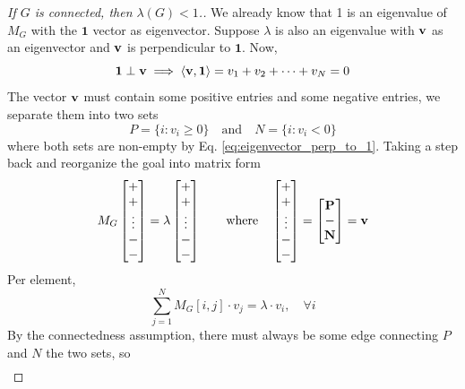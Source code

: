 \begin{proof} [If $G$ is connected, then $\lambda(G) < 1$.] We already know that 1 is an eigenvalue of $M_G$ with the $\mathbf 1$ vector as eigenvector. Suppose $\lambda$ is also an eigenvalue with $\mathbf{v}$ as an eigenvector and $\mathbf{v}$ is perpendicular to $\mathbf 1$. Now, 
\begin{equation}
	\label{eq:eigenvector_perp_to_1}
	\mathbf 1 \perp \mathbf{v} \implies \langle \mathbf{v}, \mathbf 1 \rangle = v_1 + v_2 + \dots  + v_N  = 0
\end{equation}
The vector $\mathbf{v}$ must contain some positive entries and some negative entries, we separate them into two sets
\begin{equation}
	P = \{ i : v_i \geq 0\} \quad \text{and} \quad N = \{ i : v_i < 0 \}
\end{equation}
where both sets are non-empty by Eq. \ref{eq:eigenvector_perp_to_1}. Taking a step back and reorganize the goal into matrix form
\begin{equation}
	M_G \begin{bmatrix}
		+ \\ + \\ \vdots \\ - \\ -
	\end{bmatrix} = \lambda \begin{bmatrix}
		+ \\ + \\ \vdots \\ - \\ -
	\end{bmatrix}\quad \quad \text{where} \quad \begin{bmatrix}
		+ \\ + \\ \vdots \\ - \\ - \end{bmatrix} = \begin{bmatrix}
			\mathbf P \\ - \\ \mathbf N
		\end{bmatrix} = \mathbf{v}
\end{equation}
Per element, 
\begin{equation}
	\sum_{j = 1}^N M_G[i, j]\cdot v_j = \lambda \cdot v_i, \quad \forall i
\end{equation}
By the connectedness assumption, there must always be some edge connecting $P$ and $N$ the two sets, so
\begin{align}

\end{align}
\end{proof}
